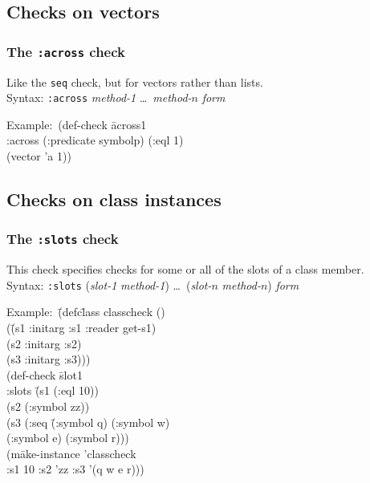\documentclass{article}
\begin{document}
\subsection{Checks on vectors}

\subsubsection{The \texttt{:across} check } 
Like the \texttt{seq} check, but for vectors rather than
lists.
\\ Syntax: \texttt{:across} \textit{method-1} \ldots\ \textit{method-$n$} \textit{form}
{\ttfamily\begin{tabbing}
\textrm{Example:}\ (def-check \=across1
\\ \>  :across (:predicate symbolp) (:eql 1)
\\ \>  (vector 'a 1))
\end{tabbing}}

\subsection{Checks on class instances}

\subsubsection{The \texttt{:slots} check } 
This check specifies checks for some or all of the slots of a class
member.
\\ Syntax: \texttt{:slots} (\textit{slot-1} \textit{method-1})  \ldots\ (\textit{slot-$n$} \textit{method-$n$}) \textit{form}
{\ttfamily\begin{tabbing}
\textrm{Example:}\ \= (defc\=lass classcheck ()
\\ \> \> (\=(s1 :initarg :s1 :reader get-s1)
\\ \> \> \> (s2 :initarg :s2)
\\ \> \> \> (s3 :initarg :s3)))
\\ \> (def-check \=slot1
\\ \> \>  :slots \=(s1 (:eql 10))
\\ \> \>  \>(s2 (:symbol zz))
\\ \> \>  \>(s3 (:seq \=(:symbol q) (:symbol w)
\\ \> \>  \> \> (:symbol e) (:symbol r)))
\\ \> \>  (m\=ake-instance 'classcheck
\\ \> \> \>  :s1 10 :s2 'zz :s3 '(q w e r)))
\end{tabbing}}
\end{document}
